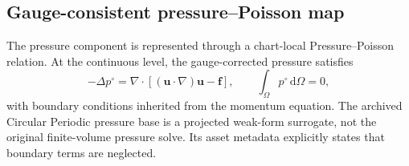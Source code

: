 \subsection{Gauge-consistent pressure--Poisson map}

The pressure component is represented through a chart-local
Pressure--Poisson relation.
At the continuous level, the gauge-corrected pressure satisfies
\begin{equation}
    -\Delta p^\circ
    =
    \nabla\!\cdot
    \left[
        (\bm u\!\cdot\!\nabla)\bm u
        -
        \bm f
    \right],
    \qquad
    \int_\Omega p^\circ\,\mathrm d\Omega=0,
    \label{eq:app_continuous_pressure_poisson}
\end{equation}
with boundary conditions inherited from the momentum equation. The archived Circular Periodic pressure base is a projected weak-form surrogate, not the original finite-volume pressure solve. Its asset metadata explicitly states that boundary terms are neglected.

